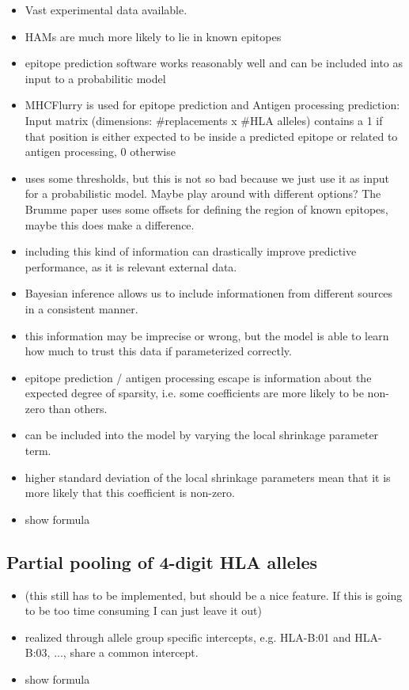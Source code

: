 \documentclass[fleqn,11pt]{SelfArx} %
\begin{document}
\begin{itemize}
  \item Vast experimental data available.
  \item HAMs are much more likely to lie in known epitopes
  \item epitope prediction software works reasonably well and can be included into as
    input to a probabilitic model
  \item MHCFlurry is used for epitope prediction and Antigen processing prediction:
    Input matrix (dimensions: \#replacements x \#HLA alleles) contains a 1 if that
    position is either expected to be inside a predicted epitope or related to
    antigen processing, 0 otherwise
  \item uses some thresholds, but this is not so bad because we just use it as
    input for a probabilistic model. Maybe play around with different options?
    The Brumme paper uses some offsets for defining the region of known epitopes,
    maybe this does make a difference.
  \item including this kind of information can drastically improve predictive performance,
    as it is relevant external data.
  \item Bayesian inference allows us to include informationen from different sources in
    a consistent manner.
  \item this information may be imprecise or wrong, but the model is able to learn how much 
    to trust this data if parameterized correctly.
  \item epitope prediction / antigen processing escape is information about the expected
    degree of sparsity, i.e. some coefficients are more likely to be non-zero than others.
  \item can be included into the model by varying the local shrinkage parameter term.
  \item higher standard deviation of the local shrinkage parameters mean that
    it is more likely that this coefficient is non-zero.
  \item show formula
\end{itemize}

\subsection*{Partial pooling of 4-digit HLA alleles}

\begin{itemize}
  \item (this still has to be implemented, but should be a nice feature. If this
    is going to be too time consuming I can just leave it out)
  \item realized through allele group specific intercepts, e.g. HLA-B:01 and 
  HLA-B:03, ..., share a common intercept.
  \item show formula
\end{itemize}
\end{document}
